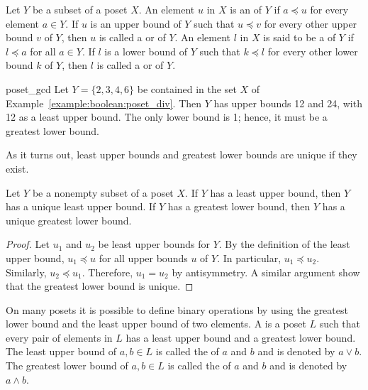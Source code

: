 Let $Y$ be a subset of a poset $X$. An element $u$ in $X$ is an  of $Y$ if $a \preceq u$ for every element $a \in Y$. If $u$ is an upper bound of $Y$ such that $u \preceq v$ for every other upper bound $v$ of $Y$, then $u$ is called a  or  of $Y$. An element $l$ in $X$ is said to be a  of $Y$ if $l \preceq a$ for all $a \in Y$. If $l$ is a lower bound of $Y$ such that $k \preceq l$ for every other lower bound $k$ of $Y$, then $l$ is called a  or  of $Y$.


\begin{example}{poset_gcd}
Let $Y = \{  2, 3, 4, 6 \}$ be contained in the set $X$ of Example~\ref{example:boolean:poset_div}.  Then $Y$ has upper bounds 12 and 24, with 12 as a least upper bound.  The only lower bound is 1; hence, it must be a greatest lower bound.
\end{example}


As it turns out, least upper bounds and greatest lower bounds are unique if they exist.

\begin{theorem}
Let $Y$ be a nonempty subset of a poset $X$. If $Y$ has a least upper bound, then $Y$ has a unique least upper bound. If $Y$ has a greatest lower bound, then $Y$ has a unique greatest lower bound.
\end{theorem} 

\begin{proof}
Let $u_1$ and $u_2$ be least upper bounds for $Y$. By the definition
of the least upper bound, $u_1 \preceq u$ for all upper bounds $u$ of
$Y$. In particular, $u_1 \preceq u_2$. Similarly, $u_2 \preceq u_1$.
Therefore, $u_1 = u_2$ by antisymmetry.  A similar argument show that
the greatest lower bound is unique.
\end{proof}
 
\medskip
 
On many posets it is possible to define binary operations
by using the greatest lower bound and the least upper bound of two
elements. A  is a poset $L$
such that every pair of elements in $L$ has a least upper bound and a
greatest lower bound. The least upper bound of $a, b \in L$ is called
the \label{join} of $a$ and $b$ and is denoted 
by $a \vee b$.  The greatest lower bound of $a, b \in L$ is called 
the \label{meet} of $a$ and $b$ and is denoted 
by $a \wedge b$.
 
